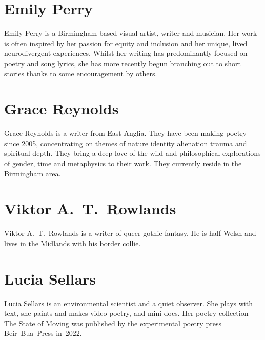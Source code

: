 \section*{Emily Perry}%

Emily Perry is a Birmingham-based visual artist, writer and
musician. Her work is often inspired by her passion for equity and
inclusion and her unique, lived neurodivergent experiences. Whilst her
writing has predominantly focused on poetry and song lyrics, she has
more recently begun branching out to short stories thanks to some
encouragement by others.

\section*{Grace Reynolds}%

Grace Reynolds is a writer from East Anglia. They have been making
poetry since 2005, concentrating on themes of nature identity
alienation trauma and spiritual depth. They bring a deep love of the
wild and philosophical explorations of gender, time and metaphysics to
their work. They currently reside in the Birmingham area.

\section*{Viktor A.~T.~Rowlands}%

Viktor A.~T.~Rowlands is a writer of queer gothic fantasy. He is half
Welsh and lives in the Midlands with his border collie.


\section*{Lucia Sellars}%

Lucia Sellars is an environmental scientist and a quiet observer.  She
plays with text, she paints and makes video-poetry, and mini-docs. Her
poetry collection The State of Moving was published by the
experimental poetry press Beir~Bua~Press in~2022.

